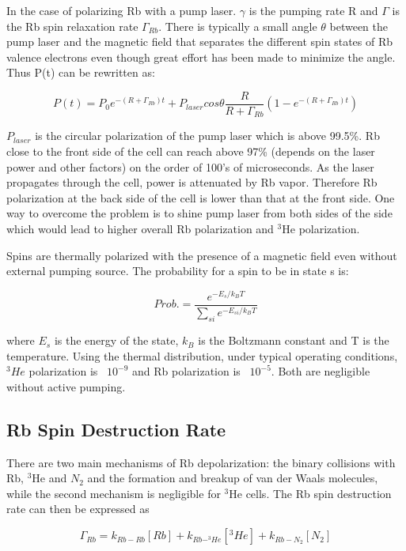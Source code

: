 In the case of polarizing Rb with a pump laser. $\gamma$ is the pumping rate R and $\Gamma$ is the Rb spin relaxation rate $\Gamma_{Rb}$. There is typically a small angle $\theta$ between the pump laser and the magnetic field that separates the different spin states of Rb valence electrons even though great effort has been made to minimize the angle. Thus P(t) can be rewritten as:

\begin{equation}\label{Pt}
P(t) = P_{0}e^{-(R+\Gamma_{Rb})t} + P_{laser}cos\theta \frac{R}{R+\Gamma_{Rb}}(1-e^{-(R+\Gamma_{Rb})t})
\end{equation}

$P_{laser}$ is the circular polarization of the pump laser which is above 99.5\%. Rb close to the front side of the cell can reach above 97\% (depends on the laser power and other factors) on the order of 100's of microseconds. As the laser propagates through the cell, power is attenuated by Rb vapor. Therefore Rb polarization at the back side of the cell is lower than that at the front side. One way to overcome the problem is to shine pump laser from both sides of the side which would lead to higher overall Rb polarization and $^{3}$He polarization.

Spins are thermally polarized with the presence of a magnetic field even without external pumping source. The probability for a spin to be in state s is:

\begin{equation}
Prob. = \frac{e^{-E_{s}/k_{B}T}}{\sum_{si}e^{-E_{si}/k_{B}T}}
\end{equation}

where $E_{s}$ is the energy of the state, $k_{B}$ is the Boltzmann constant and T is the temperature. Using the thermal distribution, under typical operating conditions, $^{3}He$ polarization is ~$10^{-9}$ and Rb polarization is ~$10^{-5}$. Both are negligible without active pumping.

\subsection{Rb Spin Destruction Rate}

There are two main mechanisms of Rb depolarization: the binary collisions with Rb, $^{3}$He and $N_{2}$ and the formation and breakup of van der Waals molecules, while the second mechanism is negligible for $^{3}$He cells. The Rb spin destruction rate can then be expressed as

\begin{equation}
\Gamma_{Rb}=k_{Rb-Rb}[Rb]+k_{Rb-^{3}He}[^{3}He]+k_{Rb-N_{2}}[N_{2}]
\end{equation}

